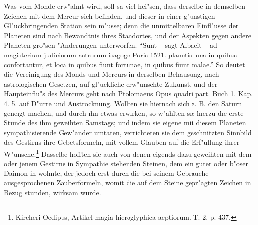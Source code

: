 \documentclass[a4paper, 11pt, oneside, polutonikogreek, german]{article}
\begin{document}
{\hspace*{0.5cm} Was vom Monde erw"ahnt wird, soll sa viel hei"sen, dass derselbe in demselben Zeichen mit dem Mercur sich befinden, und dieser in einer g"unstigen Gl"uckbringenden Station sein m"usse; denn die unmittelbaren Einfl"usse der Planeten sind nach Bewandtnis ihres Standortes, und der Aspekten gegen andere Planeten gro"sen "Anderungen unterworfen. "`Sunt -- sagt Albacit -- ad magisterium judiciorum astrorum isagoge Paris 1521. planetis loca in quibus confortantur, et loca in quibus fiunt fortunae, in quibus fiunt malae."' So deutet die Vereinigung des Monds und Mercurs in derselben Behausung, nach astrologischen Gesetzen, auf gl"uckliche erw"unschte Zukunst, und der Haupteinflu"s des Mercurs geht nach Ptolomaeus Opus quadri part. Buch 1. Kap. 4. 5. auf D"urre und Austrocknung.} Wollten sie hiernach sich z. B. den Saturn geneigt machen, und durch ihn etwas erwirken, so w"ahlten sie hierzu die erste Stunde des ihm geweihten Samstags; und indem sie eigene mit diesem Planeten sympathisierende Gew"ander umtaten, verrichteten sie dem geschnitzten Sinnbild des Gestirns ihre Gebetsformeln, mit vollem Glauben auf die Erf"ullung ihrer W"unsche.\footnote{Kircheri Oedipus, Artikel magia hieroglyphica aeptiorum. T. 2. p. 437.} Dasselbe hofften sie auch von denen eigends dazu geweihten mit dem oder jenem Gestirne in Sympathie stehenden Steinen, dem ein guter oder b"oser Daimon in wohnte, der jedoch erst durch die bei seinem Gebrauche ausgesprochenen Zauberformeln, womit die auf dem Steine gepr"agten Zeichen in Bezug stunden, wirksam wurde.
\end{document}
